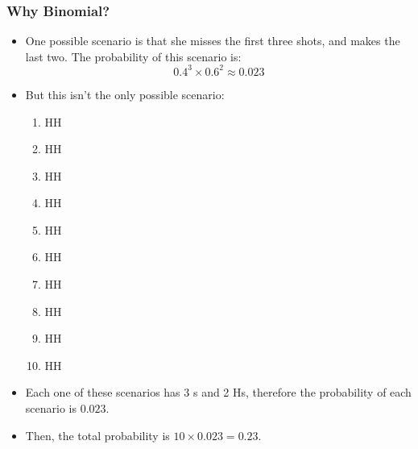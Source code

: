 \documentclass[slidestop,compress,mathserif,12pt,t,professionalfonts,xcolor=table]{beamer}
\begin{document}
\begin{frame}
\frametitle{Why Binomial?}


\pause

\begin{itemize}

\item One possible scenario is that she misses the first three shots, and makes the last two. The probability of this scenario is:
\[ 0.4^3 \times 0.6^2 \approx 0.023 \]

\pause

\item But this isn't the only possible scenario:
\vspace{-0.25cm}
\begin{changemargin}{-1.5cm}{0cm} 
\begin{multicols}{5}
\begin{enumerate}[1.]
\item {}HH
\item {}HH
\item {}HH
\item HH
\item HH
\item HH
\item HH
\item {}HH
\item {}HH
\item {}HH
\end{enumerate}
\end{multicols}
\end{changemargin}

\pause

\item Each one of these scenarios has 3 s and 2 Hs, therefore the probability of each scenario is $0.023$.

\pause

\item Then, the total probability is $10 \times 0.023 = 0.23$.

\end{itemize}

\end{frame}
\end{document}
